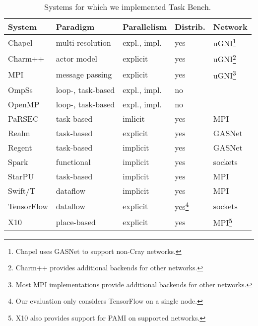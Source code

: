 \begin{table}[t]
\begin{tabular}{l | l | l | l | l}
System & Paradigm & Parallelism & Distrib. & Network \\
\hline
Chapel & multi-resolution & expl., impl. & yes & uGNI\footnote{Chapel uses GASNet to support non-Cray networks.} \\
Charm++ & actor model & explicit & yes & uGNI\footnote{Charm++ provides additional backends for other networks.} \\
MPI & message passing & explicit & yes & uGNI\footnote{Most MPI implementations provide additional backends for other networks.} \\
OmpSs & loop-, task-based & expl., impl. & no & \\
OpenMP & loop-, task-based & expl., impl. & no & \\
PaRSEC & task-based & imlicit & yes & MPI \\
Realm & task-based & explicit & yes & GASNet \\
Regent & task-based & implicit & yes & GASNet \\
Spark & functional & implicit & yes & sockets \\
StarPU & task-based & implicit & yes & MPI \\
Swift/T & dataflow & implicit & yes & MPI \\
TensorFlow & dataflow & explicit & yes\footnote{Our evaluation only considers TensorFlow on a single node.} & sockets \\
X10 & place-based & explicit & yes & MPI\footnote{X10 also provides support for PAMI on supported networks.}
\end{tabular}

\caption{Systems for which we implemented Task Bench.\label{tab:systems}}
\vspace{-0.5cm}
\end{table}
